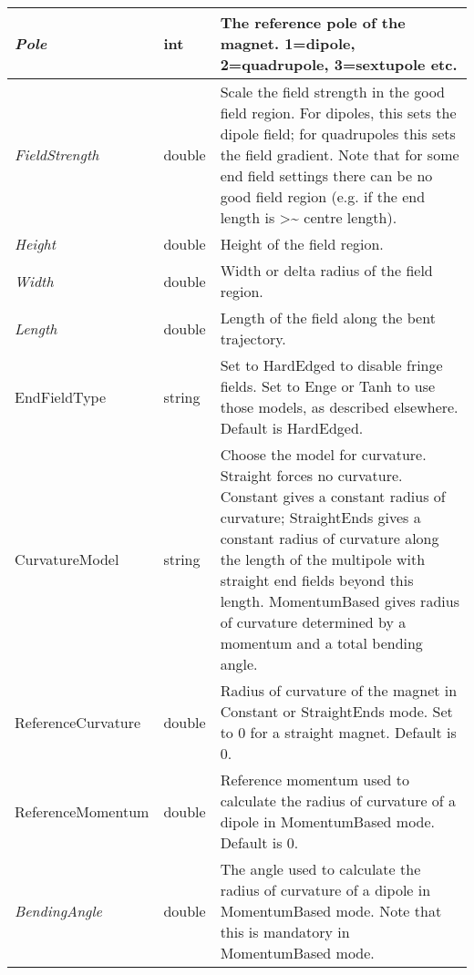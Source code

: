 \begin{center}
\tabletail{}
\tablelasttail{}
\begin{supertabular}{|m{3.691cm}|m{1.252cm}|m{12.052cm}|}
\hline
{\itshape Pole} &
int &
The reference pole of the magnet. 1=dipole, 2=quadrupole, 3=sextupole etc.\\\hline
{\itshape FieldStrength} &
double &
Scale the field strength in the good field region. For dipoles, this sets the dipole field; for quadrupoles this sets
the field gradient. Note that for some end field settings there can be no good field region (e.g. if the end length is
{\textgreater}\~{} centre length).\\\hline
{\itshape Height} &
double &
Height of the field region.\\\hline
{\itshape Width} &
double &
Width or delta radius of the field region.\\\hline
{\itshape Length} &
double &
Length of the field along the bent trajectory.\\\hline
EndFieldType &
string &
Set to HardEdged to disable fringe fields. Set to Enge or Tanh to use those models, as described elsewhere. Default is
HardEdged.\\\hline
CurvatureModel &
string &
Choose the model for curvature. Straight forces no curvature. Constant gives a constant radius of curvature;
StraightEnds gives a constant radius of curvature along the length of the multipole with straight end fields beyond
this length. MomentumBased gives radius of curvature determined by a momentum and a total bending angle.\\\hline
ReferenceCurvature &
double &
Radius of curvature of the magnet in Constant or StraightEnds mode. Set to 0 for a straight magnet. Default is
0.\\\hline
ReferenceMomentum &
double &
Reference momentum used to calculate the radius of curvature of a dipole in MomentumBased mode. Default is 0.\\\hline
{\itshape BendingAngle} &
double &
The angle used to calculate the radius of curvature of a dipole in MomentumBased mode. Note that this is mandatory in
MomentumBased mode.\\\hline
\end{supertabular}
\end{center}

